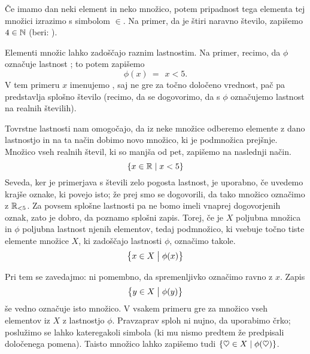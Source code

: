 
Če imamo dan neki element in neko množico, potem pripadnost tega elementa tej množici izrazimo s simbolom $\in$. Na primer, da je štiri naravno število, zapišemo $4 \in \mathbb{N}$ (beri: ).

Elementi množic lahko zadoščajo raznim lastnostim. Na primer, recimo, da $\phi$ označuje lastnost ; to potem zapišemo
\[\phi(x) \ = \ \ x < 5.\]
V tem primeru $x$ imenujemo , saj ne gre za točno določeno vrednost, pač pa predstavlja splošno število (recimo, da se dogovorimo, da s $\phi$ označujemo lastnost na realnih številih).

Tovrstne lastnosti nam omogočajo, da iz neke množice odberemo elemente z dano lastnostjo in na ta način dobimo novo množico, ki je podmnožica prejšnje. Množico vseh realnih števil, ki so manjša od pet, zapišemo na naslednji način.
\[\set{x \in \RR}{x < 5}\]
Seveda, ker je primerjava s števili zelo pogosta lastnost, je uporabno, če uvedemo krajše oznake, ki povejo isto; že prej smo se dogovorili, da tako množico označimo z $\mathbb{R}_{< 5}$. Za povsem splošne lastnosti pa ne bomo imeli vnaprej dogovorjenih oznak, zato je dobro, da poznamo splošni zapis. Torej, če je $X$ poljubna množica in $\phi$ poljubna lastnost njenih elementov, tedaj podmnožico, ki vsebuje točno tiste elemente množice $X$, ki zadoščajo lastnosti $\phi$, označimo takole.
\[\set[1]{x \in X}{\phi(x)}\]

Pri tem se zavedajmo: ni pomembno, da spremenljivko označimo ravno z $x$. Zapis
\[\set[1]{y \in X}{\phi(y)}\]
še vedno označuje isto množico. V vsakem primeru gre za množico vseh elementov iz $X$ z lastnostjo $\phi$. Pravzaprav sploh ni nujno, da uporabimo črko; poslužimo se lahko kateregakoli simbola (ki mu nismo predtem že predpisali določenega pomena). Taisto množico lahko zapišemo tudi $\set{\heartsuit \in X}{\phi(\heartsuit)}$.


